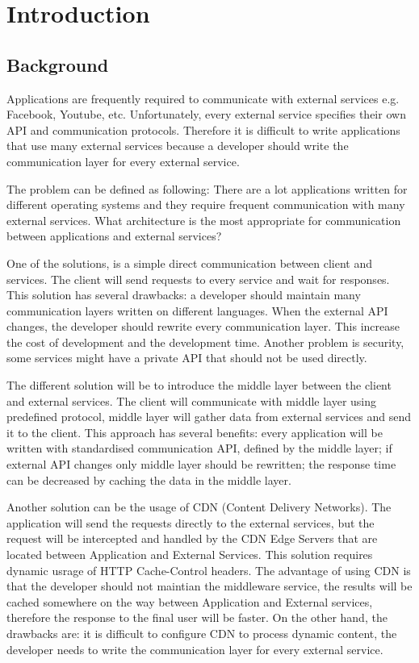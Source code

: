 \section{Introduction}

\subsection{Background}

Applications are frequently required to communicate with external services e.g. Facebook, Youtube, etc. Unfortunately, every external service specifies their own API and communication protocols. Therefore it is difficult to write applications that use many external services because a developer should write the communication layer for every external service. 

The problem can be defined as following:  There are a lot applications written for different operating systems and they require frequent communication with many external services. What architecture is the most appropriate for communication between applications and external services? 

One of the solutions, is a simple direct communication between client and services. The client will send requests to every service and wait for responses. This solution has several drawbacks: a developer should maintain many communication layers written on different languages. When the external API changes, the developer should rewrite every communication layer. This increase the cost of development and the development time. Another problem is security, some services might have a private API that should not be used directly.

The different solution will be to introduce the middle layer between the client and external services. The client will communicate with middle layer using predefined protocol, middle layer will gather data from external services and send it to the client. This approach has several benefits: every application will be written with standardised communication API, defined by the middle layer; if external API changes only middle layer should be rewritten; the response time can be decreased by caching the data in the middle layer. 

Another solution can be the usage of CDN (Content Delivery Networks). The application will send the requests directly to the external services, but the request will be intercepted and handled by the CDN Edge Servers that are located between Application and External Services. This solution requires dynamic usrage of HTTP Cache-Control headers. The advantage of using CDN is that the developer should not maintian the middleware service, the results will be cached somewhere on the way between Application and External services, therefore the response to the final user will be faster. On the other hand, the drawbacks are: it is difficult to configure CDN to process dynamic content, the developer needs to write the communication layer for every external service. 

